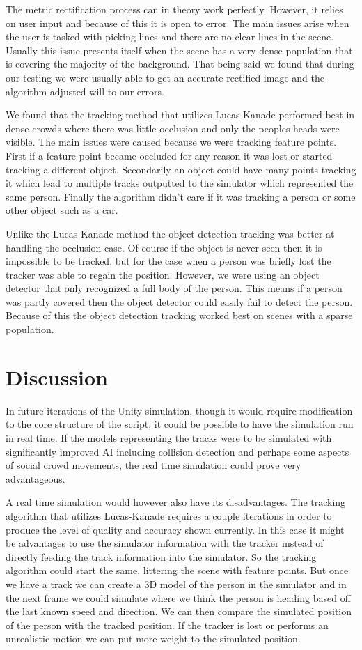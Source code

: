 \documentclass[12pt, onecolumn, conference]{IEEEtran}
\begin{document}
The metric rectification process can in theory work perfectly. However, it relies on user input and because of this it is open to error. The main issues arise when the user is tasked with picking lines and there are no clear lines in the scene. Usually this issue presents itself when the scene has a very dense population that is covering the majority of the background. That being said we found that during our testing we were usually able to get an accurate rectified image and the algorithm adjusted will to our errors.

We found that the tracking method that utilizes Lucas-Kanade performed best in dense crowds where there was little occlusion and only the peoples heads were visible. The main issues were caused because we were tracking feature points. First if a feature point became occluded for any reason it was lost or started tracking a different object. Secondarily an object could have many points tracking it which lead to multiple tracks outputted to the simulator which represented the same person. Finally the algorithm didn’t care if it was tracking a person or some other object such as a car.

Unlike the Lucas-Kanade method the object detection tracking was better at handling the occlusion case. Of course if the object is never seen then it is impossible to be tracked, but for the case when a person was briefly lost the tracker was able to regain the position. However, we were using an object detector that only recognized a full body of the person. This means if a person was partly covered then the object detector could easily fail to detect the person. Because of this the object detection tracking worked best on scenes with a sparse population.

\section{Discussion}

In future iterations of the Unity simulation, though it would require modification to the core structure of the script, it could be possible to have the simulation run in real time. If the models representing the tracks were to be simulated with significantly improved AI including collision detection and perhaps some aspects of social crowd movements, the real time simulation could prove very advantageous. 

A real time simulation would however also have its disadvantages. The tracking algorithm that utilizes Lucas-Kanade requires a couple iterations in order to produce the level of quality and accuracy shown currently. In this case it might be advantages to use the simulator information with the tracker instead of directly feeding the track information into the simulator. So the tracking algorithm could start the same, littering the scene with feature points. But once we have a track we can create a 3D model of the person in the simulator and in the next frame we could simulate where we think the person is heading based off the last known speed and direction. We can then compare the simulated position of the person with the tracked position. If the tracker is lost or performs an unrealistic motion we can put more weight to the simulated position.
\end{document}
